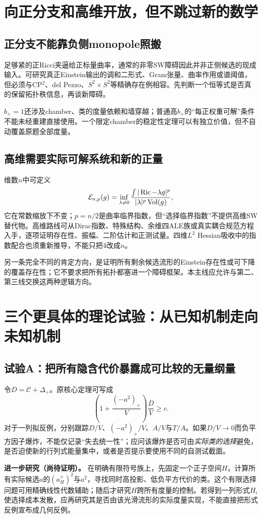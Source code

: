 \documentclass[UTF8,fontset=fandol,zihao=-4]{ctexart}
\DeclareMathOperator{\Ric}{Ric}\DeclareMathOperator{\Rm}{Rm}
\DeclareMathOperator{\Vol}{Vol}\DeclareMathOperator{\diam}{diam}
\theoremstyle{cn}
\newcommand{\newidea}{\par\noindent\textbf{进一步研究（尚待证明）。}}
\begin{document}
\section{向正分支和高维开放，但不跳过新的数学}
\subsection{正分支不能靠负侧monopole照搬}
足够紧的正Ricci夹逼给正标量曲率，通常的非零SW障碍因此并非正侧候选的现成输入。可研究真正Einstein输出的调和二形式、Gram张量、曲率作用或谱阈值，但必须与CP$^2$、del Pezzo、$S^2\times S^2$等精确存在例相容。先判断一个恒等式是否真的保留拓扑秩信息，再谈新障碍。

$b_+=1$还涉及chamber、类的度量依赖和墙穿越；普通高$b_+$的“每正权重可解”条件不能未经重建直接使用。一个限定chamber的稳定性定理可以有独立价值，但不自动覆盖原题全部度量。

\subsection{高维需要实际可解系统和新的正量}
维数$n$中可定义
\[
 \cE_{n,p}(g)=\inf_{\lambda\ne0}
 \frac{\int|\Ric-\lambda g|^p}{|\lambda|^p\Vol(g)},
\]
它在常数缩放下不变；$p=n/2$是曲率临界指数，但“选择临界指数”不提供高维SW替代物。高维路线可从Dirac指数、特殊结构、余维四ALE族或真实耦合规范方程入手，逐项证明存在性、振幅、二阶估计和正测试量。四维$L^2$ Hessian吸收中的指数配合也须重新推导，不能只把4改成$n$。

另一条完全不同的肯定方向，是证明所有剩余候选流形的Einstein存在性或可下降的覆盖存在性；它不要求把所有拓扑都塞进一个障碍框架。本主线应允许与第二、第三线交换这两种逻辑方向。

\section{三个更具体的理论试验：从已知机制走向未知机制}
\subsection{试验A：把所有隐含代价暴露成可比较的无量纲量}
令$D=\mathcal C+\Delta_+$。原核心定理可写成
\[
 \left(1+\frac{(-a^2)_+}{V}\right)\frac{D}{V}\ge c.
\]
对于一列拟反例，分别跟踪$D/V$、$(-a^2)_+/V$、$A/V$与$T/A$。如果$D/V\to0$而负平方因子爆炸，不能仅记录“失去统一性”；应问该爆炸是否可由\emph{实际类的选择}避免，是否迫使新的行列式能量集中，或者是否提示要使用不同的自测试截面。

\newidea
在明确有限符号族上，先固定一个正子空间$H$，计算所有实际候选$a$的$(a_H^+)^2$与$a^2$，寻找同时高投影、低负平方代价的类。这个有限选择问题可用精确线性代数辅助；随后才研究$H$跨所有度量的控制。若得到一列形式$H_i$使选择成本发散，应再研究其是否由该光滑流形的实际度量实现，不能直接把形式反例宣布成几何反例。
\end{document}
